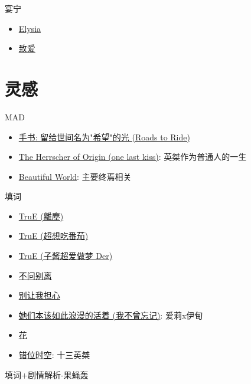 \documentclass[a4paper]{article}
\begin{document}
宴宁

\begin{itemize}
    \item \href{https://www.bilibili.com/video/BV1dq4y1N7ry/}{Elysia}
    \item \href{https://www.bilibili.com/video/BV1bB4y1L7qh/}{致爱}
\end{itemize}

\section{灵感}

MAD

\begin{itemize}
    \item \href{https://www.bilibili.com/video/BV1cG41157Jx/}{手书: 留给世间名为"希望"的光 (Roads to Ride)}
    \item \href{https://www.bilibili.com/video/BV1nV4y1g7ti/}{The Herrscher of Origin (one last kiss)}: 英桀作为普通人的一生
    \item \href{https://www.bilibili.com/video/BV1XX4y1o7yN/}{Beautiful World}: 主要终焉相关
\end{itemize}

填词

\begin{itemize}
    \item \href{https://www.bilibili.com/video/BV1gB4y1V7XK/}{TruE (離塵)}
    \item \href{https://www.bilibili.com/video/BV1SF411w73C/}{TruE (超想吃番茄)}
    \item \href{https://www.bilibili.com/video/BV1MB4y1V71h/}{TruE (子酱超爱做梦 Der)}
    \item \href{https://www.bilibili.com/video/BV19a4y1S7wF/}{不问别离}
    \item \href{https://www.bilibili.com/video/BV1vC4y177zp/}{别让我担心}
    \item \href{https://www.bilibili.com/video/BV1pu411a7cv/}{她们本该如此浪漫的活着 (我不曾忘记)}: 爱莉x伊甸
    \item \href{https://www.bilibili.com/video/BV1DT41167gi/}{花}
    \item \href{https://www.bilibili.com/video/BV1Le4y1R73E/}{错位时空}: 十三英桀
\end{itemize}

填词+剧情解析-果蝇轰
\end{document}
